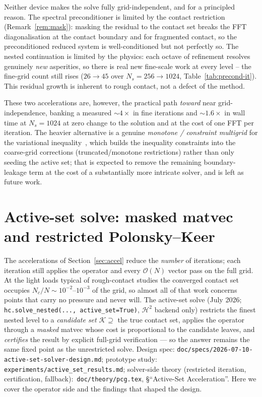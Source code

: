 \documentclass[11pt,a4paper]{article}
\newcommand{\Order}{\mathcal{O}}
\newcommand{\Htwo}{\mathcal{H}^2}
\newcommand{\code}[1]{\texttt{#1}}
\theoremstyle{definition}
\theoremstyle{remark}
\begin{document}
Neither device makes the solve fully grid-independent, and for a principled
reason. The spectral preconditioner is limited by the contact restriction
(Remark~\ref{rem:mask}): masking the residual to the contact set breaks the FFT
diagonalisation at the contact boundary and for fragmented contact, so the
preconditioned reduced system is well-conditioned but not perfectly so. The
nested continuation is limited by the physics: each octave of refinement resolves
genuinely \emph{new} asperities, so there is real new fine-scale work at every
level -- the fine-grid count still rises ($26\!\to\!45$ over $N_s=256\!\to\!1024$,
Table~\ref{tab:precond-it}). This residual growth is inherent to rough contact,
not a defect of the method.

These two accelerations are, however, the practical path \emph{toward} near
grid-independence, banking a measured $\sim4\times$ in fine iterations and
$\sim1.6\times$ in wall time at $N_s=1024$ at zero change to the solution and at
the cost of one FFT per iteration. The heavier alternative is a genuine
\emph{monotone / constraint multigrid} for the variational
inequality~\cite{Kornhuber1994}, which builds the inequality constraints into the
coarse-grid corrections (truncated/monotone restrictions) rather than only seeding
the active set; that is expected to remove the remaining boundary-leakage term at
the cost of a substantially more intricate solver, and is left as future work.

\section{Active-set solve: masked matvec and restricted Polonsky--Keer}
\label{sec:active}

The accelerations of Section~\ref{sec:accel} reduce the \emph{number} of
iterations; each iteration still applies the operator and every $\Order(N)$
vector pass on the full grid. At the light loads typical of rough-contact
studies the converged contact set occupies $N_c/N\sim10^{-2}$--$10^{-3}$ of
the grid, so almost all of that work concerns points that carry no pressure
and never will. The active-set solve (July 2026;
\code{hc.solve\_nested(..., active\_set=True)}, $\Htwo$ backend only)
restricts the finest nested level to a \emph{candidate set}
$\mathcal K\supseteq$ the true contact set, applies the operator through a
\emph{masked} matvec whose cost is proportional to the candidate leaves, and
\emph{certifies} the result by explicit full-grid verification --- so the
answer remains the same fixed point as the unrestricted solve. Design spec:
\code{doc/specs/2026-07-10-active-set-solver-design.md}; prototype study:
\code{experiments/active\_set\_results.md}; solver-side theory (restricted
iteration, certification, fallback):\ \code{doc/theory/pcg.tex},
\S``Active-Set Acceleration''. Here we cover the operator side and the
findings that shaped the design.
\end{document}
